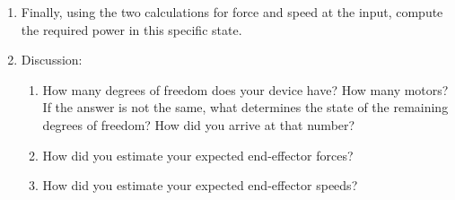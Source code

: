 \documentclass[12pt]{article}
\begin{document}
\begin{enumerate}
    \item Finally, using the two calculations for force and speed at the input, compute the required power in this specific state.

    \item Discussion:
    \begin{enumerate}
        \item How many degrees of freedom does your device have? How many motors? If the answer is not the same, what determines the state of the remaining degrees of freedom? How did you arrive at that number?
        \item How did you estimate your expected end-effector forces?
        \item How did you estimate your expected end-effector speeds?
    \end{enumerate}
\end{enumerate}
\end{document}
